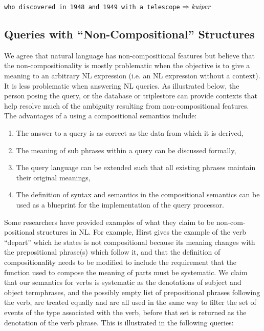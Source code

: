 \documentclass[../main.tex]{subfiles}
\begin{document}
\begin{refsection}
\texttt{who discovered in 1948 and 1949 with a telescope} $\Rightarrow \operatorname{\mathit{kuiper}}$

\subsection{Queries with ``Non-Compositional'' Structures}
\label{webist2019journal:noncompositional}

We agree that natural language has non-compositional features but believe that the non-compositionality is mostly problematic when the objective is to give a meaning to an arbitrary NL expression (i.e. an NL expression without a context). It is less problematic when answering NL queries. As illustrated below, the person posing the query, or the database or triplestore can provide contexts that help resolve much of the ambiguity resulting from non-compositional features. The advantages of a using a compositional semantics include:
\begin{enumerate}
	\item The answer to a query is as correct as the data from which it is derived,
	\item The meaning of sub phrases within a query can be discussed formally,
	\item The query language can be extended such that all existing phrases maintain their original meanings,
	\item The definition of syntax and semantics in the compositional semantics can be used as a blueprint for the implementation of the query processor.
\end{enumerate}
Some researchers have provided examples of what they claim to be non-com-\allowbreak positional structures in NL. For example, Hirst \cite{hirst1992semantic} gives the example of the verb ``depart'' which he states is not compositional because its meaning changes with the prepositional phrase(s) which follow it, and that the definition of compositionality needs to be modified to include the requirement that the function used to compose the meaning of parts must be systematic. We claim that our semantics for verbs is systematic as the denotations of subject and object termphrases, and the possibly empty list of prepositional phrases following the verb, are treated equally and are all used in the same way to filter the set of events of the type associated with the verb, before that set is returned as the denotation of the verb phrase. This is illustrated in the following queries:

\examplespacing


\end{refsection}
\end{document}
